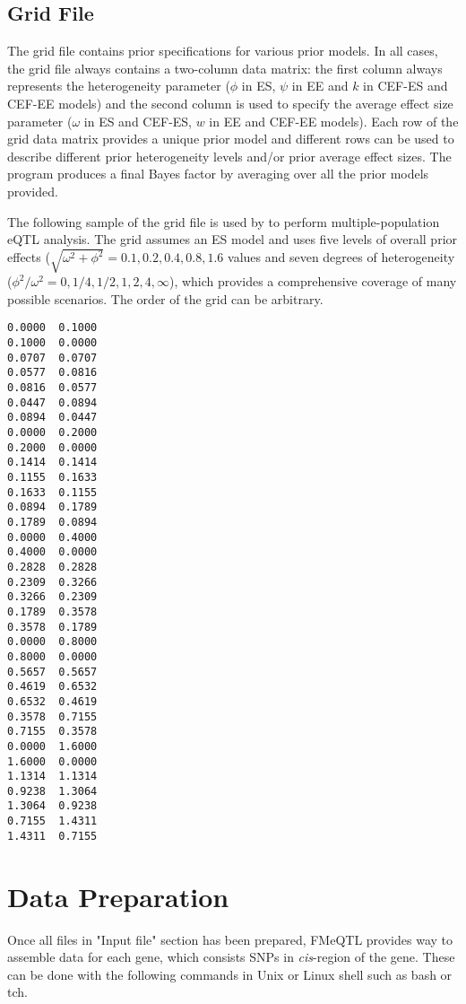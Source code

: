 \documentclass[11pt,fleqn]{article}
\begin{document}
\subsection{Grid File}
The grid file contains prior specifications for various prior models. In all cases, the grid file always contains a two-column data matrix: the first column always represents the heterogeneity parameter ($\phi$ in ES, $\psi$ in EE and $k$ in CEF-ES and CEF-EE models) and the second column is used to specify the average effect size parameter ($\omega$ in ES and CEF-ES, $w$ in EE and CEF-EE models). Each row of the grid data matrix provides a unique prior model and different rows  can be used to describe different prior heterogeneity levels and/or prior average effect sizes. The program produces a final Bayes factor by averaging over all the prior models provided.   

The following sample of the grid file is used by \cite{Wen2012} to perform multiple-population eQTL analysis. The grid assumes an ES model and uses five levels of overall prior effects ($\sqrt{\omega^2 + \phi^2} = 0.1,0.2,0.4,0.8,1.6$ values and seven degrees of heterogeneity ($\phi^2/\omega^2 = 0, 1/4,1/2,1,2,4,\infty$), which provides a comprehensive coverage of many possible scenarios. The order of the grid can be arbitrary. 
\begin{verbatim}
0.0000  0.1000
0.1000  0.0000
0.0707  0.0707
0.0577  0.0816
0.0816  0.0577
0.0447  0.0894
0.0894  0.0447
0.0000  0.2000
0.2000  0.0000
0.1414  0.1414
0.1155  0.1633
0.1633  0.1155
0.0894  0.1789
0.1789  0.0894
0.0000  0.4000
0.4000  0.0000
0.2828  0.2828
0.2309  0.3266
0.3266  0.2309
0.1789  0.3578
0.3578  0.1789
0.0000  0.8000
0.8000  0.0000
0.5657  0.5657
0.4619  0.6532
0.6532  0.4619
0.3578  0.7155
0.7155  0.3578
0.0000  1.6000
1.6000  0.0000
1.1314  1.1314
0.9238  1.3064
1.3064  0.9238
0.7155  1.4311
1.4311  0.7155
\end{verbatim}
\newpage

\section{Data Preparation}
 Once all files in "Input file" section has been prepared, FMeQTL provides way to assemble data for each gene, which consists SNPs in \textit{cis}-region of the gene. These can be done with the following commands in Unix or Linux shell such as bash or tch.
\end{document}

